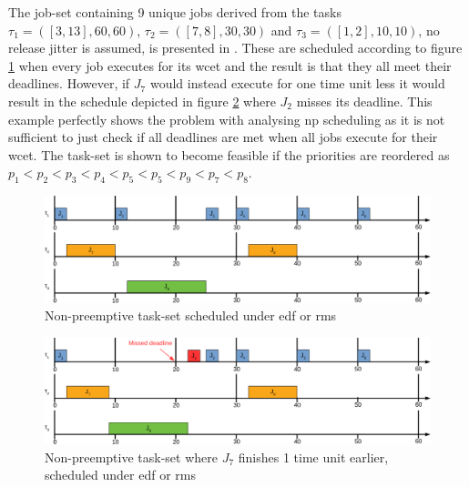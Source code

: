 \documentclass{kththesis}
\begin{document}
The job-set containing 9 unique jobs derived from the tasks $\tau_1=([3,13], 60, 60)$, $\tau_2=([7,
8], 30, 30)$ and $\tau_3=([1,2], 10, 10)$, no release jitter is assumed, is presented in
\parencite{nasri_exact_2017}. These are scheduled according to figure \ref{fig:np-test_schedule}
when every job executes for its \acrshort{wcet} and the result is that they all meet their
deadlines. However, if $J_7$ would instead execute for one time unit less it would result in the
schedule depicted in figure \ref{fig:np-test_schedule_fail} where $J_2$ misses its deadline. This
example perfectly shows the problem with analysing \acrshort{np} scheduling as it is not sufficient
to just check if all deadlines are met when all jobs execute for their \acrshort{wcet}. The task-set
is shown to become feasible if the priorities are reordered as $ p_1 < p_2 < p_3 < p_4 < p_5 < p_5 <
p_9 < p_7 < p_8$.



\begin{figure}

    \centering

    \includegraphics[width=1.0\linewidth]{images/np-test_schedule.pdf}

    \caption{Non-preemptive task-set scheduled under \acrshort{edf} or \acrshort{rms}}

    \label{fig:np-test_schedule}

\end{figure}


\begin{figure}

    \centering

    \includegraphics[width=1.0\linewidth]{images/np-test_schedule_fail.pdf}

    \caption{Non-preemptive task-set where $J_7$ finishes 1 time unit earlier, scheduled under
    \acrshort{edf} or \acrshort{rms}}

    \label{fig:np-test_schedule_fail}

\end{figure}
\end{document}
